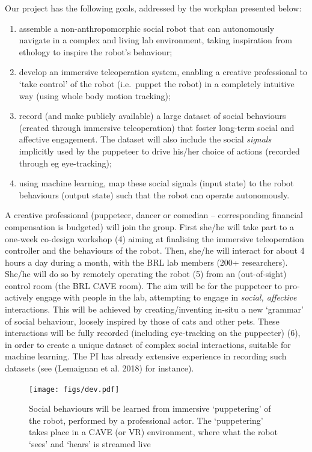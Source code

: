 \documentclass[11pt,a4paper]{report}
\begin{document}
Our project has the following goals, addressed by the workplan presented
below:

\begin{enumerate}
\def\labelenumi{\arabic{enumi}.}
\item
  assemble a non-anthropomorphic social robot that can autonomously
  navigate in a complex and living lab environment, taking inspiration
  from ethology to inspire the robot's behaviour;
\item
  develop an immersive teleoperation system, enabling a creative
  professional to `take control' of the robot (i.e.~puppet the robot) in
  a completely intuitive way (using whole body motion tracking);
\item
  record (and make publicly available) a large dataset of social
  behaviours (created through immersive teleoperation) that foster
  long-term social and affective engagement. The dataset will also
  include the social \emph{signals} implicitly used by the puppeteer to
  drive his/her choice of actions (recorded through eg eye-tracking);
\item
  using machine learning, map these social signals (input state) to the
  robot behaviours (output state) such that the robot can operate
  autonomously.
\end{enumerate}

A creative professional (puppeteer, dancer or comedian --
corresponding financial compensation is budgeted) will join the group.
First she/he will take part to a one-week co-design workshop (4) aiming
at finalising the immersive teleoperation controller and the behaviours
of the robot. Then, she/he will interact for about 4 hours a day during
a month, with the BRL lab members (200+ researchers). She/he will do so
by remotely operating the robot (5) from an (out-of-sight) control room
(the BRL CAVE room). The aim will be for the puppeteer to pro-actively
engage with people in the lab, attempting to engage in \emph{social,
affective} interactions. This will be achieved by creating/inventing
in-situ a new `grammar' of social behaviour, loosely inspired by those
of cats and other pets. These interactions will be fully recorded
(including eye-tracking on the puppeeter) (6), in order to create a
unique dataset of complex social interactions, suitable for machine
learning. The PI has already extensive experience in recording such
datasets (see (Lemaignan et al. 2018) for instance).

\begin{figure}
    \centering
    \texttt{[image: figs/dev.pdf]}
    \caption{\label{fig:support}
    Social behaviours will be learned from immersive `puppetering' of the
    robot, performed by a professional actor. The `puppetering' takes place
    in a CAVE (or VR) environment, where what the robot `sees' and `hears'
    is streamed live}
\end{figure}
\end{document}
